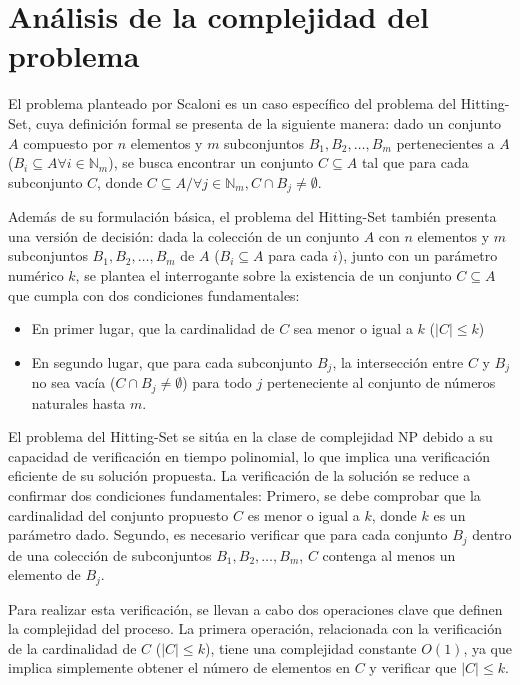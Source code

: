 \section{Análisis de la complejidad del problema}

El problema planteado por Scaloni es un caso específico del problema del 
Hitting-Set, cuya definición formal se presenta de la siguiente manera: dado un 
conjunto $A$ compuesto por $n$ elementos y $m$ subconjuntos $B_{1}, B_{2}, \dots, B_{m}$ 
pertenecientes a $A$ ($B_{i}\subseteq A \forall i \in \mathbb{N}_{m}$), se busca encontrar un conjunto $C \subseteq A$ tal que para cada 
subconjunto $C$, donde $C \subseteq A / \forall j \in \mathbb{N}_{m},  C \cap B_{j}\neq \emptyset$. 

Además de su formulación básica, el problema del Hitting-Set también presenta una versión
de decisión: dada la colección de un conjunto $A$ con $n$ elementos y $m$ subconjuntos
$B_{1}, B_{2}, \dots, B_{m}$ de $A$ ($B_{i}\subseteq A$ para cada $i$), junto con un 
parámetro numérico $k$, se plantea el interrogante sobre la existencia de un conjunto 
$C \subseteq A$ que cumpla con dos condiciones fundamentales:

\begin{itemize}
    \item En primer lugar, que la cardinalidad de $C$ sea menor o igual a $k$ ($\left| C \right|\leq k$) 
    \item En segundo lugar, que para cada subconjunto $B_{j}$, la intersección entre $C$ y $B_{j}$ no sea vacía ($C \cap B_{j} \neq \emptyset$) para todo $j$ perteneciente al conjunto de  números naturales hasta $m$.
\end{itemize}

El problema del Hitting-Set se sitúa en la clase de complejidad NP debido a su capacidad 
de verificación en tiempo polinomial, lo que implica una verificación eficiente de su 
solución propuesta. La verificación de la solución se reduce a confirmar dos condiciones 
fundamentales: Primero, se debe comprobar que la cardinalidad del conjunto propuesto $C$ 
es menor o igual a $k$, donde $k$ es un parámetro dado. Segundo, es necesario 
verificar que para cada conjunto $B_{j}$ dentro de una colección de subconjuntos 
$B_{1}, B_{2}, \dots, B_{m}$, $C$ contenga al menos un elemento de $B_{j}$.

Para realizar esta verificación, se llevan a cabo dos operaciones clave que definen la 
complejidad del proceso. La primera operación, relacionada con la verificación de la 
cardinalidad de $C$ ($\left| C \right|\leq k$), tiene una complejidad constante $O(1)$, 
ya que implica simplemente obtener el número de elementos en $C$ y verificar que $\left|C\right| \leq k$.

